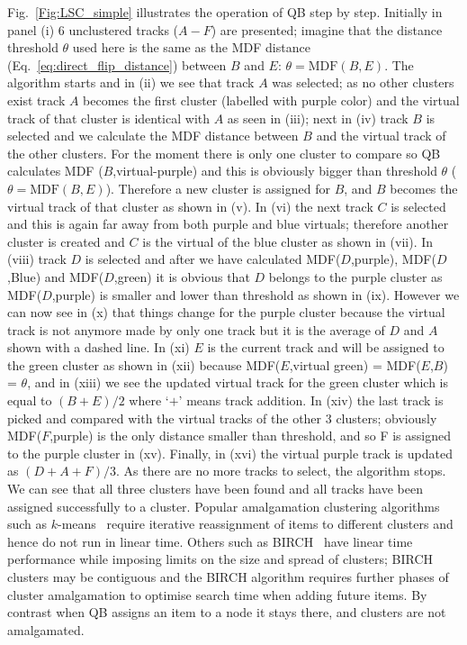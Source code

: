 \documentclass{bioinfo}
\begin{document}
\begin{methods}
Fig.~\ref{Fig:LSC_simple} illustrates the operation of QB step by step.
Initially in panel (i) 6 unclustered tracks ($A-F$) are presented; imagine
that the distance threshold $\theta$ used here is the same as the MDF
distance (Eq.~\ref{eq:direct_flip_distance}) between $B$ and $E$: $\theta =
\mathrm{MDF}(B,E)$. The algorithm starts and in (ii) we see that track $A$ was
selected; as no other clusters exist track $A$ becomes the first cluster
(labelled with purple color) and the virtual track of that cluster is
identical with $A$ as seen in (iii); next in (iv) track $B$ is selected and
we calculate the MDF distance between $B$ and the virtual track of the
other clusters. For the moment there is only one cluster to compare so
QB calculates MDF ($B$,virtual-purple) and this is obviously bigger than
threshold $\theta$ ($\theta = \mathrm{MDF}(B,E)$).  Therefore a new cluster is
assigned for $B$, and $B$ becomes the virtual track of that cluster as shown
in (v). In (vi) the next track $C$ is selected and this is again far away
from both purple and blue virtuals; therefore another cluster is created
and $C$ is the virtual of the blue cluster as shown in (vii).  In (viii)
track $D$ is selected and after we have calculated MDF($D$,purple),
MDF($D$,Blue) and MDF($D$,green) it is obvious that $D$ belongs to the purple
cluster as MDF($D$,purple) is smaller and lower than threshold as shown in
(ix).  However we can now see in (x) that things change for the purple
cluster because the virtual track is not anymore made by only one track
but it is the average of $D$ and $A$ shown with a dashed line. In (xi) $E$ is
the current track and will be assigned to the green cluster as shown in
(xii) because MDF($E$,virtual green) = MDF($E$,$B$) = $\theta$, and in (xiii)
we see the updated virtual track for the green cluster which is equal to
$(B+E)/2$ where `$+$' means track addition. In (xiv) the last track is picked
and compared with the virtual tracks of the other 3 clusters; obviously
MDF($F$,purple) is the only distance smaller than threshold, and so F is
assigned to the purple cluster in (xv).  Finally, in (xvi) the virtual
purple track is updated as $(D+A+F)/3$. As there are no more tracks to
select, the algorithm stops. We can see that all three clusters have
been found and all tracks have been assigned successfully to a cluster.
Popular amalgamation clustering algorithms such as
$k$-means~\citep{steinhaus1956division, macqueen1967some} require
iterative reassignment of items to different clusters and hence do not
run in linear time. Others such as BIRCH~\citep{zhang1997birch} have
linear time performance while imposing limits on the size and spread of
clusters; BIRCH clusters may be contiguous and the BIRCH algorithm
requires further phases of cluster amalgamation to optimise search time
when adding future items. By contrast when QB assigns an item to a node
it stays there, and clusters are not amalgamated.


\end{methods}
\end{document}
